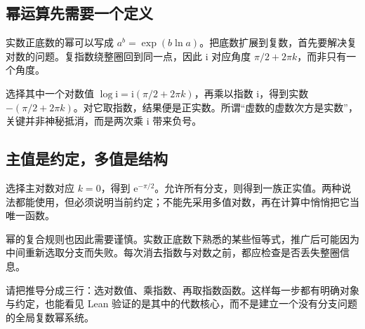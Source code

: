 \subsection*{幂运算先需要一个定义}
实数正底数的幂可以写成 $a^b=\exp(b\ln a)$。把底数扩展到复数，首先要解决复对数的问题。复指数绕整圈回到同一点，因此 $\mathrm i$ 对应角度 $\pi/2+2\pi k$，而非只有一个角度。

选择其中一个对数值 $\log\mathrm i=\mathrm i(\pi/2+2\pi k)$，再乘以指数 $\mathrm i$，得到实数 $-(\pi/2+2\pi k)$。对它取指数，结果便是正实数。所谓“虚数的虚数次方是实数”，关键并非神秘抵消，而是两次乘 $\mathrm i$ 带来负号。

\subsection*{主值是约定，多值是结构}
选择主对数对应 $k=0$，得到 $\mathrm e^{-\pi/2}$。允许所有分支，则得到一族正实值。两种说法都能使用，但必须说明当前约定；不能先采用多值对数，再在计算中悄悄把它当唯一函数。

幂的复合规则也因此需要谨慎。实数正底数下熟悉的某些恒等式，推广后可能因为中间重新选取分支而失败。每次消去指数与对数之前，都应检查是否丢失整圈信息。

请把推导分成三行：选对数值、乘指数、再取指数函数。这样每一步都有明确对象与约定，也能看见 Lean 验证的是其中的代数核心，而不是建立一个没有分支问题的全局复数幂系统。
